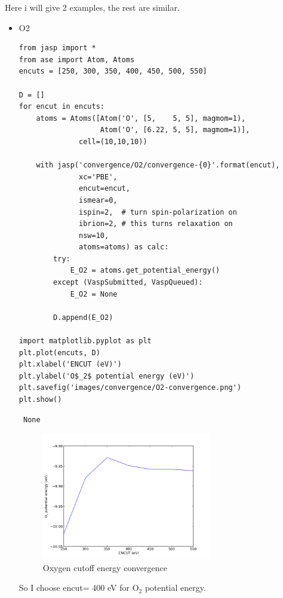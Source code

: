 \documentclass[11pt]{article}
\begin{document}
Here i will give 2 examples, the rest are similar.
\begin{itemize}

\item O2\\
\label{sec-3-2-1-1}%
\begin{verbatim}
from jasp import *
from ase import Atom, Atoms
encuts = [250, 300, 350, 400, 450, 500, 550]

D = []
for encut in encuts:
    atoms = Atoms([Atom('O', [5,    5, 5], magmom=1),
                   Atom('O', [6.22, 5, 5], magmom=1)],
              cell=(10,10,10))

    with jasp('convergence/O2/convergence-{0}'.format(encut),
              xc='PBE',
              encut=encut,
              ismear=0,
              ispin=2,  # turn spin-polarization on
              ibrion=2, # this turns relaxation on
              nsw=10,
              atoms=atoms) as calc:
        try:
            E_O2 = atoms.get_potential_energy()
        except (VaspSubmitted, VaspQueued):
            E_O2 = None

        D.append(E_O2)

import matplotlib.pyplot as plt
plt.plot(encuts, D)
plt.xlabel('ENCUT (eV)')
plt.ylabel('O$_2$ potential energy (eV)')
plt.savefig('images/convergence/O2-convergence.png')
plt.show()
\end{verbatim}

\begin{verbatim}
 None
\end{verbatim}
\begin{figure}[H]
\centering
\includegraphics[width=0.7\textwidth]{./images/convergence/O2-convergence.png}
\caption{Oxygen cutoff energy convergence}
\end{figure}

So I choose encut= 400 eV for O$_2$ potential energy.



\end{itemize}
\end{document}
